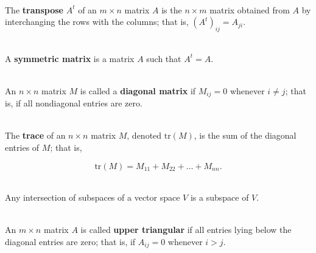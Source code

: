 \begin{definition}
	\hfill\\
	The \textbf{transpose} $A^t$ of an $m \times n$ matrix $A$ is the $n \times m$ matrix obtained from $A$ by interchanging the rows with the columns; that is, $(A^t)_{ij} = A_{ji}$.
\end{definition}

\begin{definition}
	\hfill\\
	A \textbf{symmetric matrix} is a matrix $A$ such that $A^t = A$.
\end{definition}

\begin{definition}
	\hfill\\
	An $n \times n$ matrix $M$ is called a \textbf{diagonal matrix} if $M_{ij} = 0$ whenever $i \neq j$; that is, if all nondiagonal entries are zero.
\end{definition}

\begin{definition}
	\hfill\\
	The \textbf{trace} of an $n \times n$ matrix $M$, denoted $\text{tr}(M)$, is the sum of the diagonal entries of $M$; that is,

	\[\text{tr}(M) = M_{11} + M_{22} + \dots + M_{nn}.\]
\end{definition}

\begin{theorem}
	\hfill\\
	Any intersection of subspaces of a vector space $V$ is a subspace of $V$.
\end{theorem}

\begin{definition}
	\hfill\\
	An $m \times n$ matrix $A$ is called \textbf{upper triangular} if all entries lying below the diagonal entries are zero; that is, if $A_{ij} = 0$ whenever $i > j$.
\end{definition}
